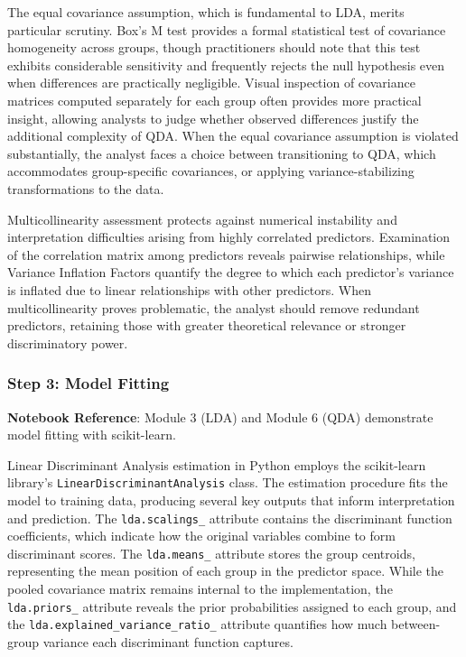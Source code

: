 \documentclass[
]{article}
\begin{document}
The equal covariance assumption, which is fundamental to LDA, merits
particular scrutiny. Box's M test provides a formal statistical test of
covariance homogeneity across groups, though practitioners should note
that this test exhibits considerable sensitivity and frequently rejects
the null hypothesis even when differences are practically negligible.
Visual inspection of covariance matrices computed separately for each
group often provides more practical insight, allowing analysts to judge
whether observed differences justify the additional complexity of QDA.
When the equal covariance assumption is violated substantially, the
analyst faces a choice between transitioning to QDA, which accommodates
group-specific covariances, or applying variance-stabilizing
transformations to the data.

Multicollinearity assessment protects against numerical instability and
interpretation difficulties arising from highly correlated predictors.
Examination of the correlation matrix among predictors reveals pairwise
relationships, while Variance Inflation Factors quantify the degree to
which each predictor's variance is inflated due to linear relationships
with other predictors. When multicollinearity proves problematic, the
analyst should remove redundant predictors, retaining those with greater
theoretical relevance or stronger discriminatory power.

\subsubsection{Step 3: Model Fitting}

\textbf{Notebook Reference}: Module 3 (LDA) and Module 6 (QDA)
demonstrate model fitting with scikit-learn.

Linear Discriminant Analysis estimation in Python employs the
scikit-learn library's \texttt{LinearDiscriminantAnalysis} class. The
estimation procedure fits the model to training data, producing several
key outputs that inform interpretation and prediction. The
\texttt{lda.scalings\_} attribute contains the discriminant function
coefficients, which indicate how the original variables combine to form
discriminant scores. The \texttt{lda.means\_} attribute stores the group
centroids, representing the mean position of each group in the predictor
space. While the pooled covariance matrix remains internal to the
implementation, the \texttt{lda.priors\_} attribute reveals the prior
probabilities assigned to each group, and the
\texttt{lda.explained\_variance\_ratio\_} attribute quantifies how much
between-group variance each discriminant function captures.
\end{document}
